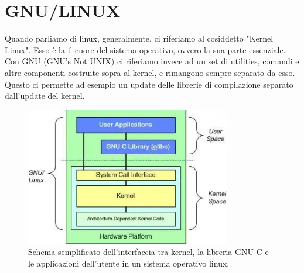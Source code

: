 \section{GNU/LINUX}
Quando parliamo di linux, generalmente, ci riferiamo al cosiddetto "Kernel Linux". Esso è la il cuore del sistema operativo, ovvero la sua parte essenziale. Con GNU (GNU's Not UNIX) ci riferiamo invece ad un set di utilities, comandi e altre componenti costruite sopra al kernel, e rimangono sempre separato da esso. Questo ci permette ad esempio un update delle librerie di compilazione separato dall'update del kernel. 
\begin{figure}
\centering
\includegraphics[width=0.8\textwidth]{img/core_gnu_linux.png}
\caption{Schema semplificato dell'interfaccia tra kernel, la libreria GNU C e le applicazioni dell'utente in un sistema operativo linux.}
\label{linux_core}
\end{figure}

